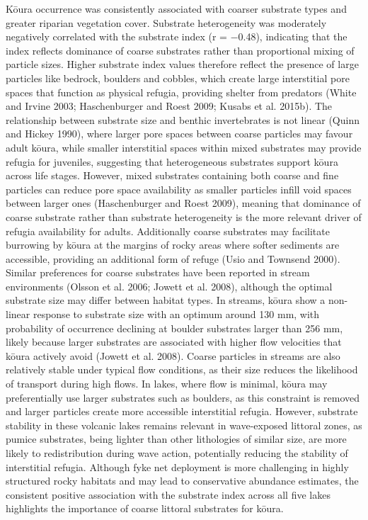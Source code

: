 \documentclass[
  12pt,
  a4paper,
  oneside]{scrbook}
\begin{document}
Kōura occurrence was consistently associated with coarser substrate
types and greater riparian vegetation cover. Substrate heterogeneity was
moderately negatively correlated with the substrate index (r = −0.48),
indicating that the index reflects dominance of coarse substrates rather
than proportional mixing of particle sizes. Higher substrate index
values therefore reflect the presence of large particles like bedrock,
boulders and cobbles, which create large interstitial pore spaces that
function as physical refugia, providing shelter from predators (White
and Irvine 2003; Haschenburger and Roest 2009; Kusabs et al. 2015b). The
relationship between substrate size and benthic invertebrates is not
linear (Quinn and Hickey 1990), where larger pore spaces between coarse
particles may favour adult kōura, while smaller interstitial spaces
within mixed substrates may provide refugia for juveniles, suggesting
that heterogeneous substrates support kōura across life stages. However,
mixed substrates containing both coarse and fine particles can reduce
pore space availability as smaller particles infill void spaces between
larger ones (Haschenburger and Roest 2009), meaning that dominance of
coarse substrate rather than substrate heterogeneity is the more
relevant driver of refugia availability for adults. Additionally coarse
substrates may facilitate burrowing by kōura at the margins of rocky
areas where softer sediments are accessible, providing an additional
form of refuge (Usio and Townsend 2000). Similar preferences for coarse
substrates have been reported in stream environments (Olsson et al.
2006; Jowett et al. 2008), although the optimal substrate size may
differ between habitat types. In streams, kōura show a non-linear
response to substrate size with an optimum around 130 mm, with
probability of occurrence declining at boulder substrates larger than
256 mm, likely because larger substrates are associated with higher flow
velocities that kōura actively avoid (Jowett et al. 2008). Coarse
particles in streams are also relatively stable under typical flow
conditions, as their size reduces the likelihood of transport during
high flows. In lakes, where flow is minimal, kōura may preferentially
use larger substrates such as boulders, as this constraint is removed
and larger particles create more accessible interstitial refugia.
However, substrate stability in these volcanic lakes remains relevant in
wave-exposed littoral zones, as pumice substrates, being lighter than
other lithologies of similar size, are more likely to redistribution
during wave action, potentially reducing the stability of interstitial
refugia. Although fyke net deployment is more challenging in highly
structured rocky habitats and may lead to conservative abundance
estimates, the consistent positive association with the substrate index
across all five lakes highlights the importance of coarse littoral
substrates for kōura.
\end{document}
